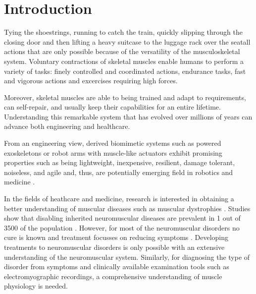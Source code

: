 \chapter{Introduction}




Tying the shoestrings, running to catch the train, quickly slipping through the closing door and then lifting a heavy suitcase to the luggage rack over the seat\textemdash all actions that are only possible because of the versatility of the musculoskeletal system.
Voluntary contractions of skeletal muscles enable humans to perform a variety of tasks: finely controlled and coordinated actions, endurance tasks, fast and vigorous actions and excercises requiring high forces.

Moreover, skeletal muscles are able to being trained and adapt to requirements, can self-repair, and usually keep their capabilities for an entire lifetime. Understanding this remarkable system that has evolved over millions of years can advance both engineering and healthcare.

From an engineering view, derived biomimetic systems such as powered exoskeletons or robot arms with muscle-like actuators exhibit promising properties such as being lightweight, inexpensive, resilient, damage tolerant, noiseless, and agile and, thus, are potentially emerging field in robotics and medicine \cite{BarCohen2003,BarCohen2004Electroactivepolymer,Mirvakili2018}.

In the fields of heathcare and medicine, research is interested in obtaining a better understanding of muscular diseases such as muscular dystrophies \cite{Emery2002}. Studies show that disabling inherited neuromuscular diseases are prevalent in 1 out of 3500 of the population \cite{Emery1991}. However, for most of the neuromuscular disorders no cure is known and treatment focusses on reducing symptoms \cite{Emery2002,Heidlauf2015Diss}. Developing treatments to neuromuscular disorders is only possible with an extensive understanding of the neuromuscular system. Similarly, for diagnosing the type of disorder from symptoms and clinically available examination tools such as electromyographic recordings, a comprehensive understanding of muscle physiology is needed.

